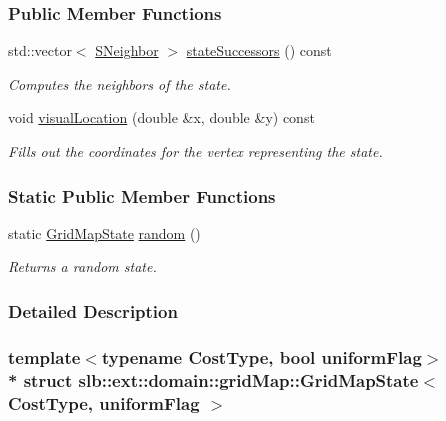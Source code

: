 \subsubsection*{Public Member Functions}
\begin{DoxyCompactItemize}
\item 
std\+::vector$<$ \hyperlink{structslb_1_1ext_1_1domain_1_1gridMap_1_1GridMapState_af34ea6314b8473d2a81ebd1feec1df1d}{S\+Neighbor} $>$ \hyperlink{structslb_1_1ext_1_1domain_1_1gridMap_1_1GridMapState_ad12f2d588dc5cf7b30d64a3b29978fa0}{state\+Successors} () const 
\begin{DoxyCompactList}\small\item\em Computes the neighbors of the state. \end{DoxyCompactList}\item 
void \hyperlink{structslb_1_1ext_1_1domain_1_1gridMap_1_1GridMapState_a0e90fef9cbc1b5e858df22d2b70089d1}{visual\+Location} (double \&x, double \&y) const 
\begin{DoxyCompactList}\small\item\em Fills out the coordinates for the vertex representing the state. \end{DoxyCompactList}\end{DoxyCompactItemize}
\subsubsection*{Static Public Member Functions}
\begin{DoxyCompactItemize}
\item 
static \hyperlink{structslb_1_1ext_1_1domain_1_1gridMap_1_1GridMapState}{Grid\+Map\+State} \hyperlink{structslb_1_1ext_1_1domain_1_1gridMap_1_1GridMapState_ab6d1893e8db9715e8d5ae4e2ad6c2b38}{random} ()
\begin{DoxyCompactList}\small\item\em Returns a random state. \end{DoxyCompactList}\end{DoxyCompactItemize}


\subsubsection{Detailed Description}
\subsubsection*{template$<$typename Cost\+Type, bool uniform\+Flag$>$\\*
struct slb\+::ext\+::domain\+::grid\+Map\+::\+Grid\+Map\+State$<$ Cost\+Type, uniform\+Flag $>$}

